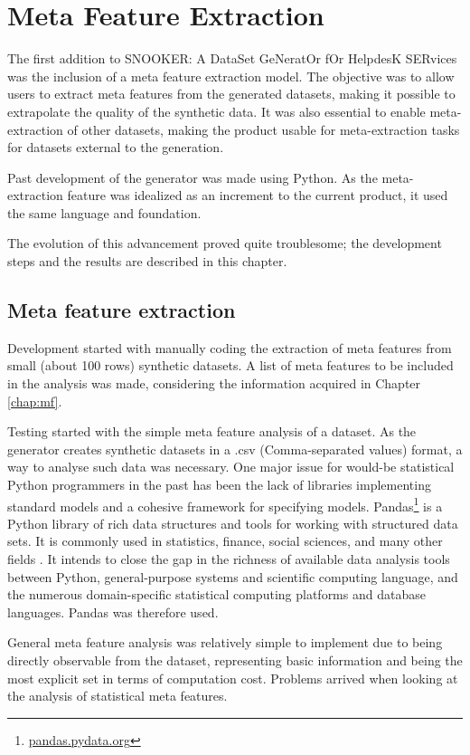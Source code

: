 \chapter{Meta Feature Extraction}
\label{chap:class}

The first addition to SNOOKER: A DataSet GeNeratOr fOr HelpdesK SERvices was the inclusion of a meta feature extraction model. The objective was to allow users to extract meta features from the generated datasets, making it possible to extrapolate the quality of the synthetic data. It was also essential to enable meta-extraction of other datasets, making the product usable for meta-extraction tasks for datasets external to the generation.

Past development of the generator was made using Python. As the meta-extraction feature was idealized as an increment to the current product, it used the same language and foundation.

The evolution of this advancement proved quite troublesome; the development steps and the results are described in this chapter.

\section{Meta feature extraction}
Development started with manually coding the extraction of meta features from small (about 100 rows) synthetic datasets. A list of meta features to be included in the analysis was made, considering the information acquired in Chapter \ref{chap:mf}.

Testing started with the simple meta feature analysis of a dataset. As the generator creates synthetic datasets in a .csv (Comma-separated values) format, a way to analyse such data was necessary. One major issue for would-be statistical Python programmers in the past has been the lack of libraries implementing standard models and a cohesive framework for specifying models. Pandas\footnote{\href{https://pandas.pydata.org/}{pandas.pydata.org}} is a Python library of rich data structures and tools for working with structured data sets. It is commonly used in statistics, finance, social sciences, and many other fields \citep{mckinney2011pandas}. It intends to close the gap in the richness of available data analysis tools between Python, general-purpose systems and scientific computing language, and the numerous domain-specific statistical computing platforms and database languages. Pandas was therefore used.

General meta feature analysis was relatively simple to implement due to being directly observable from the dataset, representing basic information and being the most explicit set in terms of computation cost. Problems arrived when looking at the analysis of statistical meta features. 

